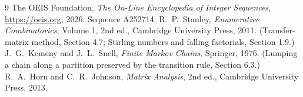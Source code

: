 \documentclass[11pt,a4paper]{article}
\theoremstyle{plain}
\theoremstyle{definition}
\begin{document}
\begin{thebibliography}{9}
 The OEIS Foundation, \emph{The On-Line Encyclopedia of Integer
Sequences}, \url{https://oeis.org}, 2026. Sequence A252714.
 R.~P.~Stanley, \emph{Enumerative Combinatorics}, Volume 1, 2nd ed.,
Cambridge University Press, 2011. (Transfer-matrix method, Section 4.7; Stirling numbers and
falling factorials, Section 1.9.)
 J.~G.~Kemeny and J.~L.~Snell, \emph{Finite Markov Chains}, Springer,
1976. (Lumping a chain along a partition preserved by the transition rule, Section 6.3.)
 R.~A.~Horn and C.~R.~Johnson, \emph{Matrix Analysis}, 2nd ed., Cambridge
University Press, 2013.
\end{thebibliography}
\end{document}
